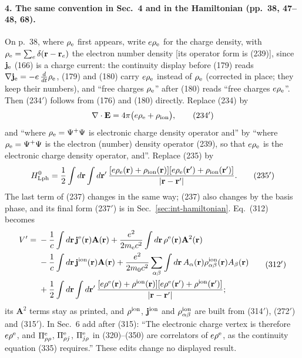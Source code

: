 \documentclass[11pt]{article}
\begin{document}
\paragraph{4. The same convention in Sec.~4 and in the Hamiltonian (pp.~38, 47--48, 68).}
On p.~38, where $\rho_{\rm e}$ first appears, write $e\rho_{\rm e}$ for the charge density, with
$\rho_{\rm e}=\sum_e\delta(\mathbf r-\mathbf r_e)$ the electron number density [its operator form is
(239)], since $\mathbf j_{\rm e}$ (166) is a charge current: the continuity display before (179) reads
$\nabla\mathbf j_{\rm e}=-e\,\frac{d}{dt}\rho_{\rm e}$, (179) and (180) carry $e\rho_{\rm e}$ instead of
$\rho_{\rm e}$ (corrected in place; they keep their numbers), and ``free charges $\rho_{\rm e}$'' after (180) reads ``free
charges $e\rho_{\rm e}$''. Then (234$'$) follows from (176) and (180) directly. Replace (234) by
\begin{equation*}
\nabla\cdot\mathbf E=4\pi\big(e\rho_{\rm e}+\rho_{\rm ion}\big),
\tag{234$'$}
\end{equation*}
and ``where $\rho_{\rm e}=\Psi^+\Psi$ is electronic charge density operator and'' by ``where
$\rho_{\rm e}=\Psi^+\Psi$ is the electron (number) density operator (239), so that $e\rho_{\rm e}$ is the
electronic charge density operator, and''. Replace (235) by
\begin{equation*}
H^0_{\rm Lph}=\frac12\int d\mathbf r\int d\mathbf r'\,
\frac{[e\rho_{\rm e}(\mathbf r)+\rho_{\rm ion}(\mathbf r)][e\rho_{\rm e}(\mathbf r')+\rho_{\rm ion}(\mathbf r')]}
{|\mathbf r-\mathbf r'|} .
\tag{235$'$}
\end{equation*}
The last term of (237) changes in the same way; (237) also changes by the basis phase, and its final
form (237$'$) is in Sec.~\ref{sec:int-hamiltonian}. Eq.~(312) becomes
\begin{equation*}
\begin{split}
V'={}&-\frac1c\int d\mathbf r\,\mathbf j^{\rm e}(\mathbf r)\mathbf A(\mathbf r)
+\frac{e^2}{2m_{\rm e}c^2}\int d\mathbf r\,\rho^{\rm e}(\mathbf r)\mathbf A^2(\mathbf r)\\
&-\frac1c\int d\mathbf r\,\mathbf j^{\rm ion}(\mathbf r)\mathbf A(\mathbf r)
+\frac{e^2}{2m_0c^2}\sum_{\alpha\beta}\int d\mathbf r\,A_\alpha(\mathbf r)\rho^{\rm ion}_{\alpha\beta}(\mathbf r)
A_\beta(\mathbf r)\\
&+\frac12\int d\mathbf r\int d\mathbf r'\,
\frac{[e\rho^{\rm e}(\mathbf r)+\rho^{\rm ion}(\mathbf r)][e\rho^{\rm e}(\mathbf r')+\rho^{\rm ion}(\mathbf r')]}
{|\mathbf r-\mathbf r'|};
\end{split}
\tag{312$'$}
\end{equation*}
its $\mathbf A^2$ terms stay as printed, and $\rho^{\rm ion}$, $\mathbf j^{\rm ion}$ and $\rho^{\rm ion}_{\alpha\beta}$ are
built from (314$'$), (272$'$) and (315$'$). In Sec.~6 add after (315): ``The electronic charge vertex is
therefore $e\rho^{\rm e}$, and $\Pi^{\rm e}_{\rho\rho}$, $\Pi^{\rm e}_{\rho j}$, $\Pi^{\rm e}_{j\rho}$ in
(320)--(350) are correlators of $e\rho^{\rm e}$, as the continuity equation (335) requires.'' These edits
change no displayed result.
\end{document}
